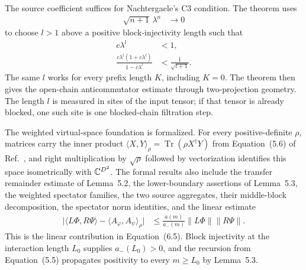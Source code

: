 \documentclass{article}
\begin{document}
The source coefficient suffices for Nachtergaele's C3 condition. The
theorem
uses
\begin{align}
    \sqrt{n+1}\,\lambda^n
     & \longrightarrow0
    \label{eq:cpgsv21_martingale_overlap_c3_decay_threshold}
\end{align}
to choose $l>1$ above a positive block-injectivity length such that
\begin{align}
    c\lambda^l
     & <1,
    \label{eq:cpgsv21_martingale_overlap_c3_chosen_smallness} \\
    \frac{c\lambda^l(1+c\lambda^l)}{1-c\lambda^l}
     & <\frac{1}{\sqrt{l+1}}.
    \label{eq:cpgsv21_martingale_overlap_c3_chosen_threshold}
\end{align}
The same $l$ works for every prefix length $K$, including $K=0$. The theorem
then gives the open-chain anticommutator estimate through two-projection
geometry. The length $l$ is measured in sites of the input tensor; if that
tensor is already blocked, one such site is one blocked-chain filtration step.

The weighted virtual-space foundation is formalized. For every
positive-definite $\rho$, matrices carry the inner product
$\langle X,Y\rangle_\rho=\operatorname{Tr}(\rho X^\dagger Y)$ from
Equation~(5.6) of Ref.~\cite{Fannes1992Finitely}, and right multiplication by
$\sqrt\rho$ followed by vectorization identifies this space isometrically with
$\mathbb{C}^{D^2}$. The formal results also include the transfer remainder estimate
of Lemma~5.2, the lower-boundary assertions of Lemma~5.3, the weighted
spectator families, the two source aggregates, their middle-block
decomposition, the spectator norm identities, and the linear estimate
\begin{align}
    \bigl|\langle L\Phi,R\Psi\rangle
    -\langle A_\varphi,A_\psi\rangle_\rho\bigr|
     & \leq\frac{a(m)}{a_-(m)}\lVert L\Phi\rVert\lVert R\Psi\rVert.
    \label{eq:cpgsv21_martingale_overlap_fnw_linear_6_5}
\end{align}
This is the linear contribution in Equation~(6.5). Block injectivity at the
interaction length $L_0$ supplies $a_-(L_0)>0$, and the recursion from
Equation~(5.5) propagates positivity to every $m\geq L_0$ by Lemma~5.3.
\end{document}

